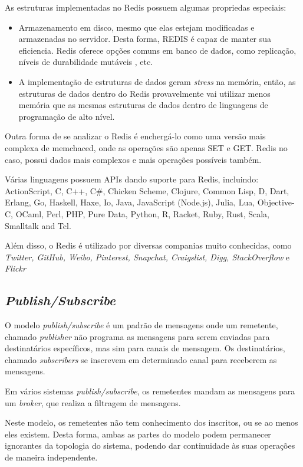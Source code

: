 \documentclass[10pt]{IEEEtran}
\begin{document}
As estruturas implementadas no Redis possuem algumas propriedas especiais:
\begin{itemize}
\item Armazenamento em disco, mesmo que elas estejam modificadas e armazenadas no servidor. Desta forma, REDIS é capaz de manter sua eficiencia.
Redis oferece opções comuns em banco de dados, como replicação, níveis de durabilidade mutáveis , etc.

\item A implementação de estruturas de dados geram \textit{stress} na memória, então, as estruturas de dados dentro do Redis provavelmente vai utilizar menos memória que as mesmas estruturas de dados dentro de linguagens de programação de alto nível.
\end{itemize}

Outra forma de se analizar o Redis é enchergá-lo como uma versão mais complexa de memchaced, onde as operações são apenas SET e GET. Redis no caso, possui dados mais complexos e mais operações possíveis também.

Várias linguagens possuem APIs dando suporte para Redis, incluindo: ActionScript, C, C++, C\#, Chicken Scheme, Clojure, Common Lisp, D, Dart, Erlang, Go, Haskell, Haxe, Io, Java, JavaScript (Node.js), Julia, Lua, Objective-C, OCaml, Perl, PHP, Pure Data, Python, R, Racket, Ruby, Rust, Scala, Smalltalk and Tcl.

Além disso, o Redis é utilizado por diversas companias muito conhecidas, como \textit{Twitter, GitHub, Weibo, Pinterest, Snapchat, Craigslist, Digg, StackOverflow} e \textit{Flickr}

\subsection{\textit{Publish/Subscribe}}

O modelo \textit{publish/subscribe} é um padrão de mensagens onde um remetente, chamado \textit{publisher} não programa as mensagens para serem enviadas para destinatários específicos, mas sim para canais de mensagem. Os destinatários, chamado \textit{subscribers} se inscrevem em determinado canal para receberem as mensagens.

Em vários sistemas \textit{publish/subscribe}, os remetentes mandam as mensagens para um \textit{broker}, que realiza a filtragem de mensagens.

Neste modelo, os remetentes não tem conhecimento dos inscritos, ou se ao menos eles existem. Desta forma, ambas as partes do modelo podem permanecer ignorantes da topologia do sistema, podendo dar continuidade às suas operações de maneira independente.
\end{document}
